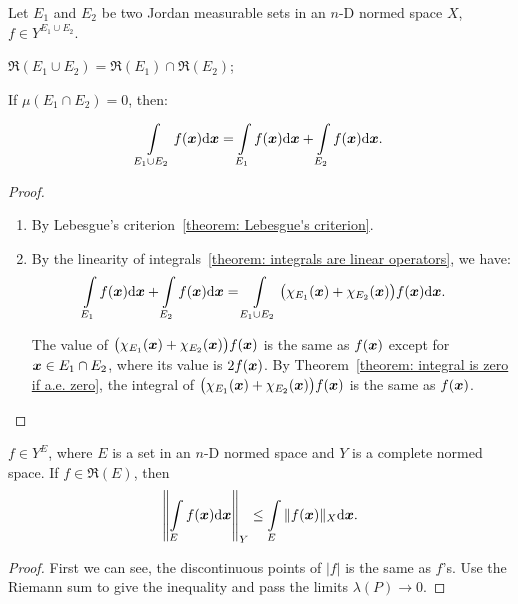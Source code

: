\documentclass[openany]{book}
\begin{document}
\begin{theorem}
	Let $E_1$ and $E_2$ be two Jordan measurable sets in an $n$-D normed space $X$, $f \in Y^{E_1 \cup E_2}$.
	\begin{enumerate*}
		\item $\mathfrak R(E_1 \cup E_2) = \mathfrak R(E_1) \cap \mathfrak R(E_2)$;
		\item If $\mu(E_1 \cap E_2) = 0$, then:
	\end{enumerate*} 
	\begin{equation*}
		\int\limits_{E_1 \cup E_2} f(\boldsymbol{x}) \mathrm{d} \boldsymbol{x} 
			= \int\limits_{E_1} f(\boldsymbol{x}) \mathrm{d} \boldsymbol{x}
				+ \int\limits_{E_2} f(\boldsymbol{x}) \mathrm{d} \boldsymbol{x}.
	\end{equation*}
\end{theorem}
\begin{proof}
	\begin{enumerate}
		\item By Lebesgue's criterion~\ref{theorem: Lebesgue's criterion}.
		\item By the linearity of integrals~\ref{theorem: integrals are linear operators}, we have:
		\begin{align*}
			\int\limits_{E_1} f(\boldsymbol{x}) \mathrm{d} \boldsymbol{x}
				+ \int\limits_{E_2} f(\boldsymbol{x}) \mathrm{d} \boldsymbol{x} 
				&= \int\limits_{E_1 \cup E_2} \big(
						\chi_{E_1}(\boldsymbol{x})  + \chi_{E_2}(\boldsymbol{x})
					\big) f(\boldsymbol{x}) \mathrm{d} \boldsymbol{x}.
		\end{align*}

		The value of $\big(\chi_{E_1}(\boldsymbol{x})  + \chi_{E_2}(\boldsymbol{x})\big) f(\boldsymbol{x})$ is the same as $f(\boldsymbol{x})$ except for $\boldsymbol{x} \in E_1 \cap E_2$, where its value is $2f(\boldsymbol{x})$. 
		By Theorem~\ref{theorem: integral is zero if a.e. zero}, the integral of $\big(\chi_{E_1}(\boldsymbol{x})  + \chi_{E_2}(\boldsymbol{x})\big) f(\boldsymbol{x})$ is the same as $f(\boldsymbol{x})$.
	\end{enumerate}
\end{proof}

\begin{theorem}\label{theorem: the int of abs and the abs of int}
	$f \in Y^E$, where $E$ is a set in an $n$-D normed space and $Y$ is a complete normed space. 
	If $f \in \mathfrak R(E)$, then
	\begin{equation*}
		\left\|
			\int\limits_E f(\boldsymbol{x}) \mathrm{d} \boldsymbol{x}
		\right\|_Y \leq \int\limits_E \|f(\boldsymbol{x})\|_X \mathrm{d} \boldsymbol{x}.
	\end{equation*}
\end{theorem}
\begin{proof}
	First we can see, the discontinuous points of $|f|$ is the same as $f$'s.
	Use the Riemann sum to give the inequality and pass the limits $\lambda(P) \to 0$.
\end{proof}
\end{document}
